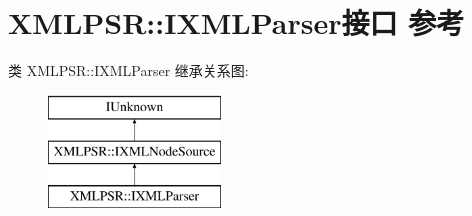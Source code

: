 \hypertarget{interface_x_m_l_p_s_r_1_1_i_x_m_l_parser}{}\section{X\+M\+L\+P\+SR\+:\+:I\+X\+M\+L\+Parser接口 参考}
\label{interface_x_m_l_p_s_r_1_1_i_x_m_l_parser}
类 X\+M\+L\+P\+SR\+:\+:I\+X\+M\+L\+Parser 继承关系图\+:\begin{figure}[H]
\begin{center}
\leavevmode
\includegraphics[height=3.000000cm]{interface_x_m_l_p_s_r_1_1_i_x_m_l_parser}
\end{center}
\end{figure}
